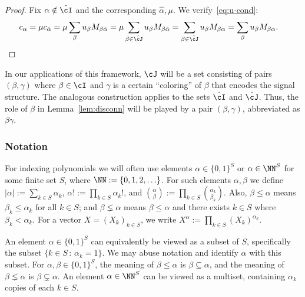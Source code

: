 \documentclass[11pt]{article}
\begin{document}
\begin{proof}
Fix $\alpha \notin \hat\cI$ and the corresponding $\hat\alpha, \mu$. We verify~\eqref{eq:u-cond}:
\begin{align*}
c_\alpha &= \mu c_{\hat\alpha} = \mu \sum_\beta u_\beta M_{\beta\hat\alpha} = \mu\sum_{\beta \in \hat\cJ} u_\beta M_{\beta\hat\alpha} = \sum_{\beta \in \hat\cJ} u_\beta M_{\beta\alpha} = \sum_{\beta} u_\beta M_{\beta\alpha}.
\end{align*}
\end{proof}


\begin{remark}
In our applications of this framework, $\cJ$ will be a set consisting of pairs $(\beta,\gamma)$ where $\beta\in \cI$ and $\gamma$ is a certain ``coloring'' of $\beta$ that encodes the signal structure. The analogous construction applies to the sets $\hat{\cI}$ and $\hat{\cJ}$. Thus, the role of $\beta$ in Lemma~\ref{lem:disconn} will be played by a pair $(\beta,\gamma)$, abbreviated as $\beta\gamma$.
\end{remark}



\subsubsection{Notation}
\label{sec:notation}

For indexing polynomials we will often use elements $\alpha \in \{0,1\}^S$ or $\alpha \in \NN^S$ for some finite set $S$, where $\NN := \{0,1,2,\ldots\}$. For such elements $\alpha,\beta$ we define $|\alpha| := \sum_{k \in S} \alpha_k$, $\alpha! := \prod_{k \in S} \alpha_k!$, and $\binom{\alpha}{\beta} := \prod_{k \in S} \binom{\alpha_k}{\beta_k}$. Also, $\beta \le \alpha$ means $\beta_k \le \alpha_k$ for all $k \in S$; and $\beta \lneq \alpha$ means $\beta \le \alpha$ and there exists $k \in S$ where $\beta_k < \alpha_k$. For a vector $X = (X_k)_{k \in S}$, we write $X^\alpha := \prod_{k \in S} (X_k)^{\alpha_k}$.

An element $\alpha \in \{0,1\}^S$ can equivalently be viewed as a subset of $S$, specifically the subset $\{k \in S \,:\, \alpha_k = 1\}$. We may abuse notation and identify $\alpha$ with this subset. For $\alpha, \beta \in \{0,1\}^S$, the meaning of $\beta \le \alpha$ is $\beta \subseteq \alpha$, and the meaning of $\beta \lneq \alpha$ is $\beta \subsetneq \alpha$. An element $\alpha \in \NN^S$ can be viewed as a multiset, containing $\alpha_k$ copies of each $k \in S$.
\end{document}
